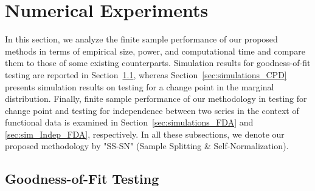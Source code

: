 \documentclass[11pt]{article}
\theoremstyle{plain}
\theoremstyle{definition}
\theoremstyle{remark}
\begin{document}
    \section{Numerical Experiments}\label{sec:simulations}
    In this section, we analyze the finite sample performance of our proposed methods in terms of empirical size, power, and computational time and compare them to those of some existing counterparts. Simulation results for goodness-of-fit testing are reported in Section~\ref{sec:simulations_GOF}, whereas Section~\ref{sec:simulations_CPD} presents simulation results on  testing for a change point in the marginal distribution.   Finally, finite sample performance of our methodology in testing for change point and testing for independence between two series in the context of functional data is examined in Section~\ref{sec:simulations_FDA} and \ref{sec:sim_Indep_FDA}, respectively. In all these subsections, we denote our proposed methodology by "SS-SN" (Sample Splitting \& Self-Normalization).

\subsection{Goodness-of-Fit Testing}\label{sec:simulations_GOF}
\end{document}
